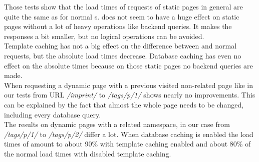 \noindent{}Those tests show that the load times of \lare{} requests of static pages in general are quite the same as for normal \httpRequest{}s.
\lare{} does not seem to have a huge effect on static pages without a lot of heavy operations like backend queries. It makes the responses a bit smaller, but no logical operations can be avoided.
\\
Template caching has not a big effect on the difference between \lare{} and normal requests, but the absolute load times decrease.
Database caching has even no effect on the absolute times because on those static pages no backend queries are made.
\\
When requesting a dynamic page with a previous visited non-related page like in our tests from URL \emph{/imprint/} to \emph{/tags/p/1/} \lare{} shows nearly no improvements.
This can be explained by the fact that almost the whole page needs to be changed, including every database query.
\\
The results on dynamic pages with a related namespace, in our case from \emph{/tags/p/1/} to \emph{/tags/p/2/} differ a lot.
When database caching is enabled the load times of \lare{} amount to about 90\% with template caching enabled and about 80\% of the normal load times with disabled template caching.
\\
